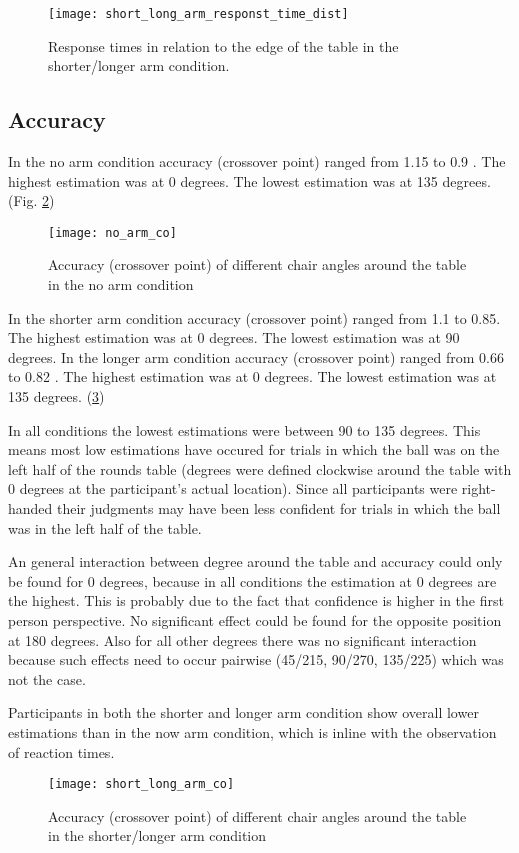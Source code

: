 \begin{figure}
\centering
  \texttt{[image: short\_long\_arm\_responst\_time\_dist]}
  \caption{Response times in relation to the edge of the table in the shorter/longer arm condition.} 
  \label{fig:short_long_arm_responst_time_dist}
\end{figure}

\subsection{Accuracy}

In the no arm condition accuracy (crossover point) ranged from 1.15 to 0.9 . The highest estimation was at 0 degrees. The lowest estimation was at 135 degrees. (Fig. \ref{fig:no_arm_co})

\begin{figure}
\centering
  \texttt{[image: no\_arm\_co]}
  \caption{Accuracy (crossover point) of different chair angles around the table in the no arm condition} 
  \label{fig:no_arm_co}
\end{figure}

 In the shorter arm condition accuracy (crossover point) ranged from 1.1 to 0.85. The highest estimation was at 0 degrees. The lowest estimation was at 90 degrees. In the longer arm condition accuracy (crossover point) ranged from 0.66 to 0.82 . The highest estimation was at 0 degrees. The lowest estimation was at 135 degrees. (\ref{fig:short_long_arm_co}) 
 
 In all conditions the lowest estimations were between 90 to 135 degrees. This means most low estimations have occured for trials in which the ball was on the left half of the rounds table (degrees were defined clockwise around the table with 0 degrees at the participant's actual location). Since all participants were right-handed their judgments may have been less confident for trials in which the ball was in the left half of the table. 
 
 An general interaction between degree around the table and accuracy could only be found for 0 degrees, because in all conditions the estimation at 0 degrees are the highest. This is probably due to the fact that confidence is higher in the first person perspective. No significant effect could be found for the opposite position at 180 degrees. Also for all other degrees there was no significant interaction because such effects need to occur pairwise (45/215, 90/270, 135/225) which was not the case.
 
 Participants in both the shorter and longer arm condition show overall lower estimations than in the now arm condition, which is inline with the observation of reaction times. 
 

 
 \begin{figure}
\centering
  \texttt{[image: short\_long\_arm\_co]}
  \caption{Accuracy (crossover point) of different chair angles around the table in the shorter/longer arm condition} 
  \label{fig:short_long_arm_co}
\end{figure}

\newpage
